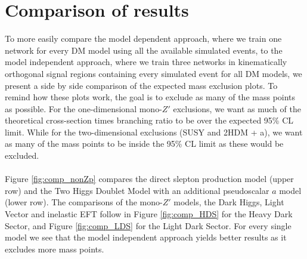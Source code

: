 \documentclass[12pt, a4paper]{book}
\begin{document}
\clearpage
\section{Comparison of results}\label{sec:comparisons_of_methods}
To more easily compare the model dependent approach, where we train one network for every DM model using all the available simulated events, to the model independent approach, where we train three networks in kinematically orthogonal signal regions containing every simulated event for all DM models, 
we present a side by side comparison of the expected mass exclusion plots. To remind how these plots work, the goal is to exclude as many of the mass points as possible. For the one-dimensional mono-$Z'$ exclusions, we want as much of the theoretical cross-section times branching ratio to be over the expected 95\% CL limit. 
While for the two-dimensional exclusions (SUSY and 2HDM + a), we want as many of the mass points to be inside the 95\% CL limit as these would be excluded.\\
\\Figure \ref{fig:comp_nonZp} compares the direct slepton production model (upper row) and the Two Higgs Doublet Model with an additional pseudoscalar $a$ model (lower row). 
The comparisons of the mono-$Z'$ models, the Dark Higgs, Light Vector and inelastic EFT follow in Figure \ref{fig:comp_HDS} for the Heavy Dark Sector, and Figure \ref{fig:comp_LDS} for the Light Dark Sector. For every single model we see that the model independent approach yields better results as it excludes more mass points.
\end{document}

